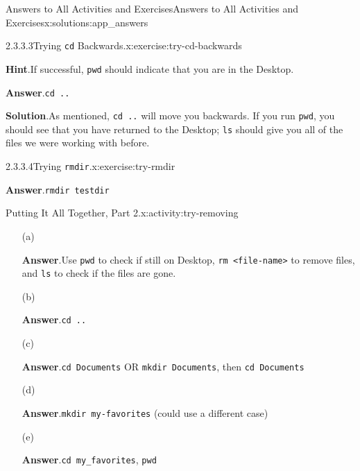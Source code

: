 \documentclass[oneside,10pt,]{book}
\newcommand{\blocktitlefont}{\relax}
\newcommand{\mono}[1]{\texttt{#1}}
\begin{document}
\begin{solutions-chapter}{Answers to All Activities and Exercises}{}{Answers to All Activities and Exercises}{}{}{x:solutions:app_answers}
\begin{inlinesolution}{2.3.3.3}{Trying \mono{cd} Backwards.}{x:exercise:try-cd-backwards}
\par\smallskip%
\noindent\textbf{\blocktitlefont Hint}.\hypertarget{g:hint:idp615574424-back}{}\quad{}If successful, \mono{pwd} should indicate that you are in the Desktop.%
\par\smallskip%
\noindent\textbf{\blocktitlefont Answer}.\hypertarget{g:answer:idp615571096-back}{}\quad{}\mono{cd ..}%
\par\smallskip%
\noindent\textbf{\blocktitlefont Solution}.\hypertarget{g:solution:idp615575576-back}{}\quad{}As mentioned, \mono{cd ..} will move you backwards. If you run \mono{pwd}, you should see that you have returned to the Desktop; \mono{ls} should give you all of the files we were working with before.%
\end{inlinesolution}%
\begin{inlinesolution}{2.3.3.4}{Trying \mono{rmdir}.}{x:exercise:try-rmdir}%
\par\smallskip%
\noindent\textbf{\blocktitlefont Answer}.\hypertarget{g:answer:idp615583640-back}{}\quad{}\mono{rmdir testdir}%
\end{inlinesolution}%
\begin{activitysolution}{2.3}{Putting It All Together, Part 2.}{x:activity:try-removing}%
\begin{enumerate}[font=\bfseries,label=(\alph*),ref=\alph*]
\item[(a)]\par\smallskip%
\noindent\textbf{\blocktitlefont Answer}.\hypertarget{g:answer:idp615586584-back}{}\quad{}Use \mono{pwd} to check if still on Desktop, \mono{rm <file-name>} to remove files, and \mono{ls} to check if the files are gone.%
\item[(b)]\par\smallskip%
\noindent\textbf{\blocktitlefont Answer}.\hypertarget{g:answer:idp615592600-back}{}\quad{}\mono{cd ..}%
\item[(c)]\par\smallskip%
\noindent\textbf{\blocktitlefont Answer}.\hypertarget{g:answer:idp615597464-back}{}\quad{}\mono{cd Documents} OR \mono{mkdir Documents}, then \mono{cd Documents}%
\item[(d)]\par\smallskip%
\noindent\textbf{\blocktitlefont Answer}.\hypertarget{g:answer:idp615601176-back}{}\quad{}\mono{mkdir my-favorites} (could use a different case)%
\item[(e)]\par\smallskip%
\noindent\textbf{\blocktitlefont Answer}.\hypertarget{g:answer:idp615597336-back}{}\quad{}\mono{cd my\_favorites}, \mono{pwd}%

\end{enumerate}
\end{activitysolution}
\end{solutions-chapter}
\end{document}
